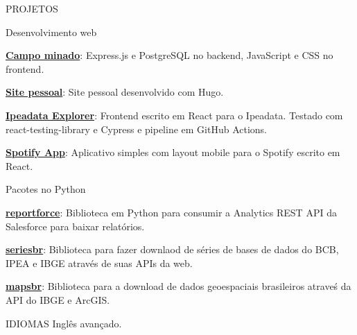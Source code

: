 \documentclass{resume}
\begin{document}

\begin{rSection}{PROJETOS}

  \begin{rSubsection}{Desenvolvimento web}{}{}
  \item
  \item \href{https://github.com/phelipetls/minesweeper.js}{\textbf{Campo
    minado}}: Express.js e PostgreSQL no backend, JavaScript e CSS no
    frontend.
  \item \href{https://phelipetls.github.io}{\textbf{Site pessoal}}: Site pessoal
    desenvolvido com Hugo.
  \item \href{http://ipeadata-explorer.surge.sh}{\textbf{Ipeadata Explorer}}:
    Frontend escrito em React para o Ipeadata. Testado com
    react-testing-library e Cypress e pipeline em GitHub Actions.
  \item \href{http://my-playlists.netlify.app}{\textbf{Spotify App}}:
    Aplicativo simples com layout mobile para o Spotify escrito em React.
  \vspace{5mm}
  \end{rSubsection}

  \begin{rSubsection}{Pacotes no Python}{}{}
  \item
  \item \href{https://github.com/phelipetls/reportforce}{\textbf{reportforce}}:
    Biblioteca em Python para consumir a Analytics REST API da Salesforce para
    baixar relatórios.
  \item \href{https://github.com/phelipetls/seriesbr}{\textbf{seriesbr}}:
    Biblioteca para fazer downlaod de séries de bases de dados do BCB, IPEA e
    IBGE através de suas APIs da web.
  \item \href{https://github.com/phelipetls/mapsbr}{\textbf{mapsbr}}:
    Biblioteca para a download de dados geoespaciais brasileiros atraveś da
    API do IBGE e ArcGIS.
  \vspace{5mm}
  \end{rSubsection}

\end{rSection}


\begin{rSection}{IDIOMAS} \itemsep -3pt
    {Inglês avançado.}
\end{rSection}
\end{document}
